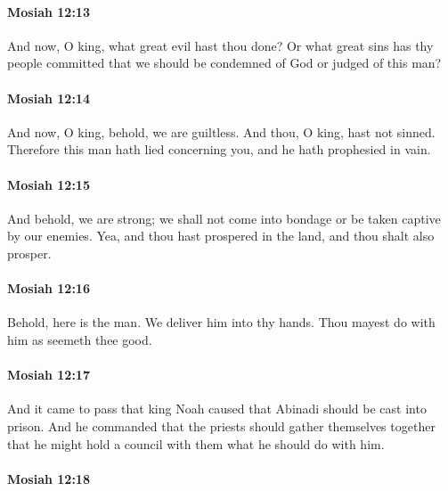 		\paragraph{Mosiah 12:13} %
			\label{MOSIAH-12-13}

			And now, O king, what great evil hast thou done?
			Or what great sins has thy people committed
			that we should be condemned of God or judged of this man?

		\paragraph{Mosiah 12:14} %
			\label{MOSIAH-12-14}

			And now, O king, behold, we are guiltless.
			And thou, O king, hast not sinned.
			Therefore this man hath lied concerning you,
			and he hath prophesied in vain.

		\paragraph{Mosiah 12:15} %
			\label{MOSIAH-12-15}

			And behold, we are strong;
			we shall not come into bondage or be taken captive by our enemies.
			Yea, and thou hast prospered in the land, and thou shalt also prosper.

		\paragraph{Mosiah 12:16} %
			\label{MOSIAH-12-16}

			Behold, here is the man.
			We deliver him into thy hands.
			Thou mayest do with him as seemeth thee good.

		\paragraph{Mosiah 12:17} %
			\label{MOSIAH-12-17}

			And it came to pass that king Noah caused
			that Abinadi should be cast into prison.
			And he commanded that the priests should gather themselves together
			that he might hold a council with them what he should do with him.

		\paragraph{Mosiah 12:18} %
			\label{MOSIAH-12-18}

